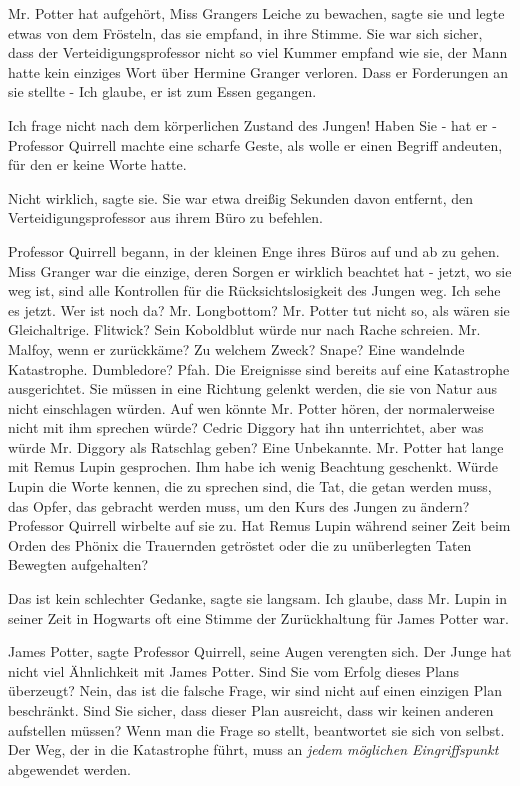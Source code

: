 \glqq Mr. Potter hat aufgehört, Miss Grangers Leiche zu bewachen\grqq{}, sagte
sie und legte etwas von dem Frösteln, das sie empfand, in ihre Stimme. Sie war
sich sicher, dass der Verteidigungsprofessor nicht so viel Kummer empfand wie
sie, der Mann hatte kein einziges Wort über Hermine Granger verloren. Dass er
Forderungen an sie stellte - \glqq Ich glaube, er ist zum Essen gegangen.\grqq{}

\glqq Ich frage nicht nach dem körperlichen Zustand des Jungen! Haben Sie - hat
er -\grqq{} Professor Quirrell machte eine scharfe Geste, als wolle er einen
Begriff andeuten, für den er keine Worte hatte.

\glqq Nicht wirklich\grqq{}, sagte sie. Sie war etwa dreißig Sekunden davon
entfernt, den Verteidigungsprofessor aus ihrem Büro zu befehlen.

Professor Quirrell begann, in der kleinen Enge ihres Büros auf und ab zu gehen.
\glqq Miss Granger war die einzige, deren Sorgen er wirklich beachtet hat -
jetzt, wo sie weg ist, sind alle Kontrollen für die Rücksichtslosigkeit des
Jungen weg. Ich sehe es jetzt. Wer ist noch da? Mr. Longbottom? Mr. Potter tut
nicht so, als wären sie Gleichaltrige. Flitwick? Sein Koboldblut würde nur nach
Rache schreien. Mr. Malfoy, wenn er zurückkäme? Zu welchem Zweck? Snape? Eine
wandelnde Katastrophe. Dumbledore? Pfah. Die Ereignisse sind bereits auf eine
Katastrophe ausgerichtet. Sie müssen in eine Richtung gelenkt werden, die sie
von Natur aus nicht einschlagen würden. Auf wen könnte Mr. Potter hören, der
normalerweise nicht mit ihm sprechen würde? Cedric Diggory hat ihn unterrichtet,
aber was würde Mr. Diggory als Ratschlag geben? Eine Unbekannte. Mr. Potter hat
lange mit Remus Lupin gesprochen. Ihm habe ich wenig Beachtung geschenkt. Würde
Lupin die Worte kennen, die zu sprechen sind, die Tat, die getan werden muss,
das Opfer, das gebracht werden muss, um den Kurs des Jungen zu ändern?\grqq{}
Professor Quirrell wirbelte auf sie zu. \glqq Hat Remus Lupin während seiner
Zeit beim Orden des Phönix die Trauernden getröstet oder die zu unüberlegten
Taten Bewegten aufgehalten?\grqq{}

\glqq Das ist kein schlechter Gedanke\grqq{}, sagte sie langsam. \glqq Ich
glaube, dass Mr. Lupin in seiner Zeit in Hogwarts oft eine Stimme der
Zurückhaltung für James Potter war.\grqq{}

\glqq James Potter\grqq{}, sagte Professor Quirrell, seine Augen verengten sich.
\glqq Der Junge hat nicht viel Ähnlichkeit mit James Potter. Sind Sie vom Erfolg
dieses Plans überzeugt? Nein, das ist die falsche Frage, wir sind nicht auf
einen einzigen Plan beschränkt. Sind Sie sicher, dass dieser Plan ausreicht,
dass wir keinen anderen aufstellen müssen? Wenn man die Frage so stellt,
beantwortet sie sich von selbst. Der Weg, der in die Katastrophe führt, muss an
\emph{jedem möglichen Eingriffspunkt} abgewendet werden.\grqq{}

